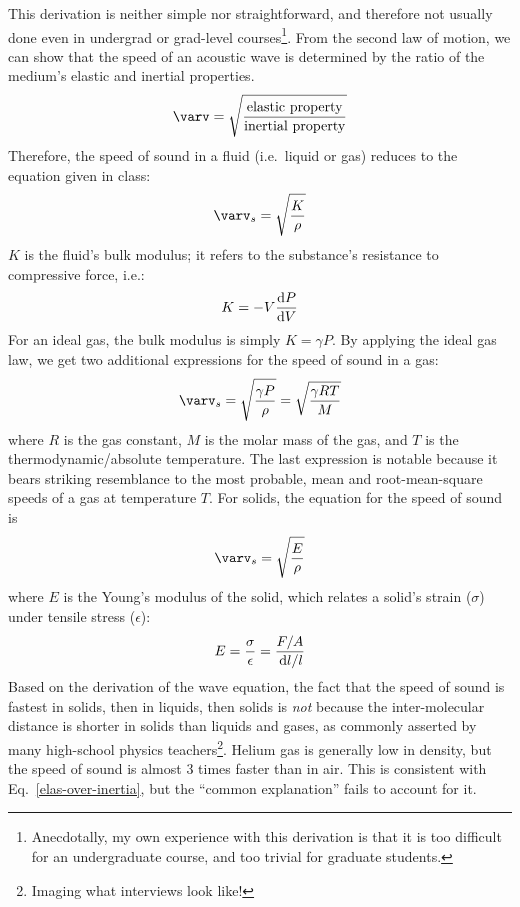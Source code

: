 \documentclass{../../oss-handout}
\begin{document}
\begin{itemize}[leftmargin=10pt]
  This derivation is neither simple nor straightforward, and therefore not
  usually done even in undergrad or grad-level courses\footnote{Anecdotally, my
  own experience with this derivation is that it is too difficult for an
  undergraduate course, and too trivial for graduate students.}. From the
  second law of motion, we can show that the speed of an acoustic wave is
  determined by the ratio of the medium's elastic and inertial properties.
  \begin{equation}
    \varv=\sqrt{\frac{\text{elastic property}}{\text{inertial property}}}
    \label{elas-over-inertia}
  \end{equation}
  Therefore, the speed of sound in a fluid (i.e.\ liquid or gas) reduces to
  the equation given in class:
  \begin{equation}
    \varv_s=\sqrt{\frac K\rho}
  \end{equation}
  $K$ is the fluid's bulk modulus; it refers to the substance's resistance to
  compressive force, i.e.:
  \begin{equation*}
    K = -V\diff PV
  \end{equation*}
  For an ideal gas, the bulk modulus is simply $K=\gamma P$. By applying the
  ideal gas law, we get two additional expressions for the speed of sound in a
  gas:
  \begin{equation}
    \varv_s=\sqrt{\frac{\gamma P}\rho}=\sqrt{\frac{\gamma RT}M}
  \end{equation}
  where $R$ is the gas constant, $M$ is the molar mass of the gas, and $T$ is
  the thermodynamic/absolute temperature. The last expression is notable
  because it bears striking resemblance to the most probable, mean and
  root-mean-square speeds of a gas at temperature $T$. For solids, the equation
  for the speed of sound is
  \begin{equation}
    \varv_s=\sqrt{\frac E\rho}
  \end{equation}
  where $E$ is the Young's modulus of the solid, which relates a solid's strain
  ($\sigma$) under tensile stress ($\epsilon$):
  \begin{equation*}
    E=\frac\sigma\epsilon=\frac{F/A}{\dl l/l}
  \end{equation*}
  Based on the derivation of the wave equation, the fact that the speed of
  sound is fastest in solids, then in liquids, then solids is \emph{not}
  because the inter-molecular distance is shorter in solids than liquids and
  gases, as commonly asserted by many high-school physics
  teachers\footnote{Imaging what interviews look like!}. Helium gas is
  generally low in density, but the speed of sound is almost 3 times faster
  than in air. This is consistent with Eq.~\ref{elas-over-inertia}, but the
  ``common explanation'' fails to account for it.


\end{itemize}
\end{document}
